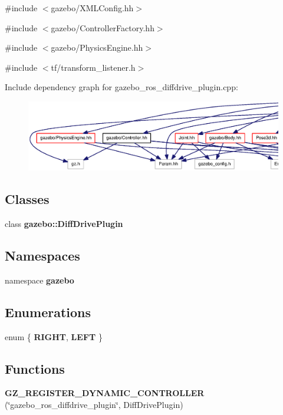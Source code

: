 {\ttfamily \#include $<$gazebo/XMLConfig.hh$>$}\par
{\ttfamily \#include $<$gazebo/ControllerFactory.hh$>$}\par
{\ttfamily \#include $<$gazebo/PhysicsEngine.hh$>$}\par
{\ttfamily \#include $<$tf/transform\_\-listener.h$>$}\par
Include dependency graph for gazebo\_\-ros\_\-diffdrive\_\-plugin.cpp:
\nopagebreak
\begin{figure}[H]
\begin{center}
\leavevmode
\includegraphics[width=400pt]{gazebo__ros__diffdrive__plugin_8cpp__incl}
\end{center}
\end{figure}
\subsection*{Classes}
\begin{DoxyCompactItemize}
\item 
class {\bf gazebo::DiffDrivePlugin}
\end{DoxyCompactItemize}
\subsection*{Namespaces}
\begin{DoxyCompactItemize}
\item 
namespace {\bf gazebo}
\end{DoxyCompactItemize}
\subsection*{Enumerations}
\begin{DoxyCompactItemize}
\item 
enum \{ {\bf RIGHT}, 
{\bf LEFT}
 \}
\end{DoxyCompactItemize}
\subsection*{Functions}
\begin{DoxyCompactItemize}
\item 
{\bf GZ\_\-REGISTER\_\-DYNAMIC\_\-CONTROLLER} (\char`\"{}gazebo\_\-ros\_\-diffdrive\_\-plugin\char`\"{}, DiffDrivePlugin)
\end{DoxyCompactItemize}



